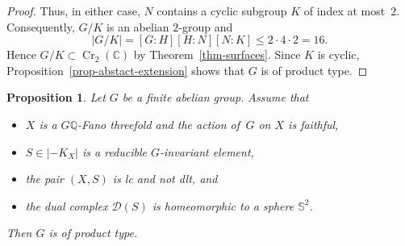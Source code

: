 \documentclass[11pt]{amsart}
\numberwithin{equation}{section}
\newtheorem{proposition}[thm]{Proposition}
\theoremstyle{definition}
\theoremstyle{remark}
\DeclareMathOperator{\Cr}{Cr}
\begin{document}
\begin{proof}
Thus, in either case, $N$ contains a cyclic subgroup $K$ of index at
most~$2$. Consequently, $G/K$ is an abelian $2$-group and
\[
|G/K|=[G:H][H:N][N:K]\leq2\cdot4\cdot2=16.
\]
Hence $G/K\subset\Cr_2(\mathbb C)$ by
Theorem~\ref{thm-surfaces}. Since $K$ is cyclic,
Proposition~\ref{prop-abstact-extension} shows that $G$ is of product
type.
\color{black}
\end{proof}

\begin{proposition}
\label{prop-reducible-4}
Let $G$ be a finite abelian group. 
Assume that 
\begin{itemize}
\item
$X$ is a $G\mathbb{Q}$-Fano threefold and the action of\, $G$ on $X$ is faithful,
\item 
$S\in |-K_X|$ is a reducible $G$-invariant element,
\item 
the pair $(X, S)$ is lc and not dlt, and
\item
the dual complex $\mathcal{D}(S)$ is homeomorphic to a sphere $\mathbb{S}^2$. 
\end{itemize}
Then $G$ is of product type.
\end{proposition}
\end{document}
